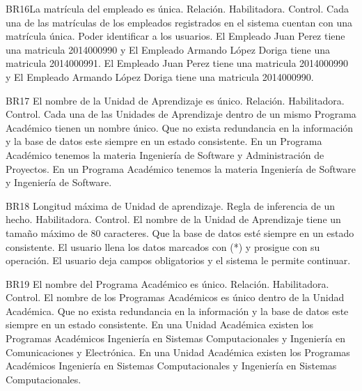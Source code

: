 \begin{BussinesRule}{BR16}{La matrícula del empleado es única.}
    \BRitem[Tipo: ]Relación.
    \BRitem[Clase: ]Habilitadora.
    \BRitem[Nivel: ]Control.
    \BRitem[Descripción:] Cada una de las matrículas de los empleados registrados en el sistema cuentan con una matrícula única.
    \BRitem[Motivación: ]Poder identificar a los usuarios.
     El Empleado Juan Perez tiene una matricula 2014000990  y El Empleado Armando López Doriga  tiene una matricula 2014000991.
    El Empleado Juan Perez tiene una matricula 2014000990 y El Empleado Armando López Doriga  tiene una matricula 2014000990.
\end{BussinesRule}

\begin{BussinesRule}{BR17} {El nombre de la Unidad de Aprendizaje es único.}
    \BRitem[Tipo: ]Relación.
    \BRitem[Clase: ]Habilitadora.
    \BRitem[Nivel: ]Control.
    \BRitem[Descripción: ]Cada  una de las Unidades de Aprendizaje dentro de un mismo Programa Académico tienen un nombre único.
    \BRitem[Motivación: ] Que no exista redundancia en la información y la base de datos este siempre en un estado consistente.
     En un Programa Académico  tenemos la materia Ingeniería de Software y Administración de Proyectos.
    En un Programa Académico  tenemos la materia Ingeniería de Software y  Ingeniería de Software.
\end{BussinesRule}

\begin{BussinesRule}{BR18}{ Longitud máxima de Unidad de aprendizaje.}
    \BRitem[Tipo: ]Regla de inferencia de un hecho.
    \BRitem[Clase: ]Habilitadora.
    \BRitem[Nivel: ]Control.
    \BRitem[Descripción: ]El nombre de la Unidad de Aprendizaje tiene un tamaño máximo de 80 caracteres.
    \BRitem[Sentencia:]
    \BRitem[Motivación: ]Que la base de datos esté siempre en un estado consistente.
     El usuario llena los datos marcados con (*) y prosigue con su operación.
    El usuario deja campos obligatorios y el sistema le permite continuar.
\end{BussinesRule}

\begin{BussinesRule}{BR19} {El nombre del Programa Académico es único.}
    \BRitem[Tipo: ]Relación.
    \BRitem[Clase: ]Habilitadora.
    \BRitem[Nivel: ]Control.
    \BRitem[Descripción: ]El nombre de los Programas Académicos es único dentro de la Unidad Académica.
    \BRitem[Motivación: ] Que no exista redundancia en la información y la base de datos este siempre en un estado consistente.
     En una Unidad Académica existen los Programas Académicos Ingeniería en Sistemas Computacionales y Ingeniería en Comunicaciones y Electrónica.
    En una Unidad Académica existen los Programas Académicos Ingeniería en Sistemas Computacionales y Ingeniería en Sistemas Computacionales.
\end{BussinesRule}

